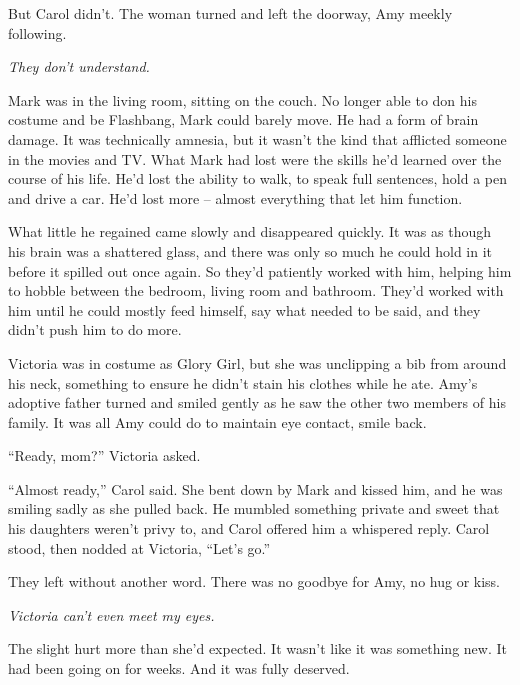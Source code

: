 But Carol didn't.  The woman turned and left the doorway, Amy meekly following.



\emph{They don't understand.}



Mark was in the living room, sitting on the couch.  No longer able to don his costume and be Flashbang, Mark could barely move.  He had a form of brain damage.  It was technically amnesia, but it wasn't the kind that afflicted someone in the movies and TV.  What Mark had lost were the skills he'd learned over the course of his life.  He'd lost the ability to walk, to speak full sentences, hold a pen and drive a car.  He'd lost more – almost everything that let him function.



What little he regained came slowly and disappeared quickly.  It was as though his brain was a shattered glass, and there was only so much he could hold in it before it spilled out once again.  So they'd patiently worked with him, helping him to hobble between the bedroom, living room and bathroom.  They'd worked with him until he could mostly feed himself, say what needed to be said, and they didn't push him to do more.



Victoria was in costume as Glory Girl, but she was unclipping a bib from around his neck, something to ensure he didn't stain his clothes while he ate.  Amy's adoptive father turned and smiled gently as he saw the other two members of his family.  It was all Amy could do to maintain eye contact, smile back.



``Ready, mom?'' Victoria asked.



``Almost ready,'' Carol said.  She bent down by Mark and kissed him, and he was smiling sadly as she pulled back.  He mumbled something private and sweet that his daughters weren't privy  to, and Carol offered him a whispered reply.  Carol stood, then nodded at Victoria, ``Let's go.''



They left without another word.  There was no goodbye for Amy, no hug or kiss.



\emph{Victoria can't even meet my eyes.}



The slight hurt more than she'd expected.  It wasn't like it was something new.  It had been going on for weeks.  And it was fully deserved.



